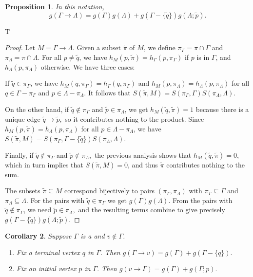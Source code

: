 \documentclass[a4paper, 12pt]{article}
\newenvironment{enumrealm}{\setlength{\abovedisplayskip}{5pt}
\setlength{\belowdisplayskip}{5pt}}{\setlength{\abovedisplayskip}{10.0pt plus 2.0pt minus 5.0pt}
\setlength{\belowdisplayskip}{10.0pt plus 2.0pt minus 5.0pt}}
\newcommand{\qo}{\tilde{q}}
\newcommand{\pin}{\tilde{p}}
\newcommand{\tilpi}{\tilde{\pi}}
\newcommand{\piga}{\pi_\Gamma}
\newcommand{\pila}{\pi_\Lambda}
\theoremstyle{plain}
\newtheorem{prop}{Proposition}[section]
\newtheorem{cor}[prop]{Corollary}
\theoremstyle{definition}
\begin{document}
\begin{prop}
	In this notation, \begin{enumrealm}\begin{equation*} g(\Gamma \rightarrow \Lambda) = g(\Gamma)g(\Lambda) + g(\Gamma - \{\qo\})g(\Lambda; \pin). \end{equation*}\end{enumrealm}
\end{prop}T
\begin{proof}
	Let $M = \Gamma \rightarrow \Lambda.$ Given a subset $\tilpi$ of $M$, we define $\piga = \pi \cap \Gamma$ and $\pila = \pi \cap \Lambda$. For all $p \neq \qo$, we have $h_M(p, \tilpi) = h_\Gamma(p, \piga)$ if $p$ is in $\Gamma$, and $h_\Lambda(p, \pila)$ otherwise. We have three cases:
	
	
	If $\qo \in \piga$, we have $h_M(q, \piga) = h_\Gamma(q, \piga)$ and $h_M(p, \pila) = h_\Lambda(p, \pila)$ for all $q \in \Gamma - \piga$ and $p \in \Lambda - \pila$. It follows that $S(\tilpi, M) = S(\piga, \Gamma)S(\pila, \Lambda).$
	
	On the other hand, if $\qo\notin\piga$ and $\pin \in \pila$, we get $h_M(\qo, \tilpi) = 1$ because there is a unique edge $\qo \rightarrow \pin,$ so it contributes nothing to the product. Since $h_M(p, \tilpi) = h_\Lambda(p, \pila)$ for all $p \in \Lambda - \pila$, we have $S(\tilpi, M) = S(\piga, \Gamma - \{\qo\})S(\pila, \Lambda)$.
	
	Finally, if $\qo \notin \piga$ and $\pin\notin\pila,$ the previous analysis shows that $h_M(\qo, \tilpi) = 0$, which in turn implies that $S(\tilpi, M) = 0$, and thus $\tilpi$ contributes nothing to the sum.
	
	The subsets $\tilpi \subseteq M$ correspond bijectively to pairs $(\piga, \pila)$ with $\piga \subseteq \Gamma$ and $\pila \subseteq \Lambda.$ For the pairs with $\qo \in \piga$ we get $g(\Gamma)g(\Lambda)$. From the pairs with $\qo \notin \piga$, we need $\pin \in \pila,$ and the resulting terms combine to give precisely $g(\Gamma - \{\qo\})g(\Lambda; \pin).$
\end{proof}

\begin{cor} Suppose $\Gamma$ is a  and $v \notin \Gamma$.\listspace
	\begin{enumerate} \listspace
		\item Fix a terminal vertex $q$ in $\Gamma$. Then $g(\Gamma \rightarrow v) = g(\Gamma) + g(\Gamma - \{q\}).$
		\item Fix an initial vertex $p$ in $\Gamma.$ Then $g(v \rightarrow \Gamma) = g(\Gamma) + g(\Gamma; p).$
	\end{enumerate}\textspace
\end{cor}
\end{document}
